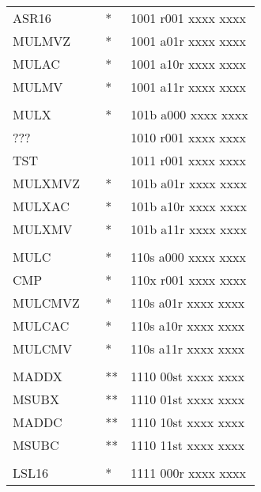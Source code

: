 \documentclass[oneside,english,a4paper,10pt,oneside,openany,final]{memoir}
\begin{document}
\begin{center}
\begin{longtable}{TllT}
ASR16       &          & *  & 1001 r001 xxxx xxxx                     \\
MULMVZ      &          & *  & 1001 a01r xxxx xxxx                     \\
MULAC       &          & *  & 1001 a10r xxxx xxxx                     \\
MULMV       &          & *  & 1001 a11r xxxx xxxx                     \\
            &          &    &                                         \\
MULX        &          & *  & 101b a000 xxxx xxxx                     \\
???         &          &    & 1010 r001 xxxx xxxx                     \\
TST         &          &    & 1011 r001 xxxx xxxx                     \\
MULXMVZ     &          & *  & 101b a01r xxxx xxxx                     \\
MULXAC      &          & *  & 101b a10r xxxx xxxx                     \\
MULXMV      &          & *  & 101b a11r xxxx xxxx                     \\
            &          &    &                                         \\
MULC        &          & *  & 110s a000 xxxx xxxx                     \\
CMP         &          & *  & 110x r001 xxxx xxxx                     \\
MULCMVZ     &          & *  & 110s a01r xxxx xxxx                     \\
MULCAC      &          & *  & 110s a10r xxxx xxxx                     \\
MULCMV      &          & *  & 110s a11r xxxx xxxx                     \\
            &          &    &                                         \\
MADDX       &          & ** & 1110 00st xxxx xxxx                     \\
MSUBX       &          & ** & 1110 01st xxxx xxxx                     \\
MADDC       &          & ** & 1110 10st xxxx xxxx                     \\
MSUBC       &          & ** & 1110 11st xxxx xxxx                     \\
            &          &    &                                         \\
LSL16       &          & *  & 1111 000r xxxx xxxx                     \\

\end{longtable}
\end{center}
\end{document}
